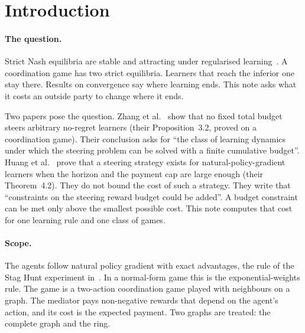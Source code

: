 \documentclass[11pt,a4paper]{article}
\theoremstyle{definition}
\theoremstyle{plain}
\begin{document}
\section{Introduction}\label{sec:intro}

\paragraph{The question.}
Strict Nash equilibria are stable and attracting under regularised learning~\cite{giannou2021,mertikopoulos2023}. A coordination game has two strict equilibria. Learners that reach the inferior one stay there. Results on convergence say where learning ends. This note asks what it costs an outside party to change where it ends.

Two papers pose the question. Zhang et al.~\cite{zhang2024} show that no fixed total budget steers arbitrary no-regret learners (their Proposition~3.2, proved on a coordination game). Their conclusion asks for ``the class of learning dynamics under which the steering problem can be solved with a finite cumulative budget''. Huang et al.~\cite{huang2025} prove that a steering strategy exists for natural-policy-gradient learners when the horizon and the payment cap are large enough (their Theorem~4.2). They do not bound the cost of such a strategy. They write that ``constraints on the steering reward budget could be added''. A budget constraint can be met only above the smallest possible cost. This note computes that cost for one learning rule and one class of games.

\paragraph{Scope.}
The agents follow natural policy gradient with exact advantages, the rule of the Stag Hunt experiment in~\cite{huang2025}. In a normal-form game this is the exponential-weights rule. The game is a two-action coordination game played with neighbours on a graph. The mediator pays non-negative rewards that depend on the agent's action, and its cost is the expected payment. Two graphs are treated: the complete graph and the ring.
\end{document}
